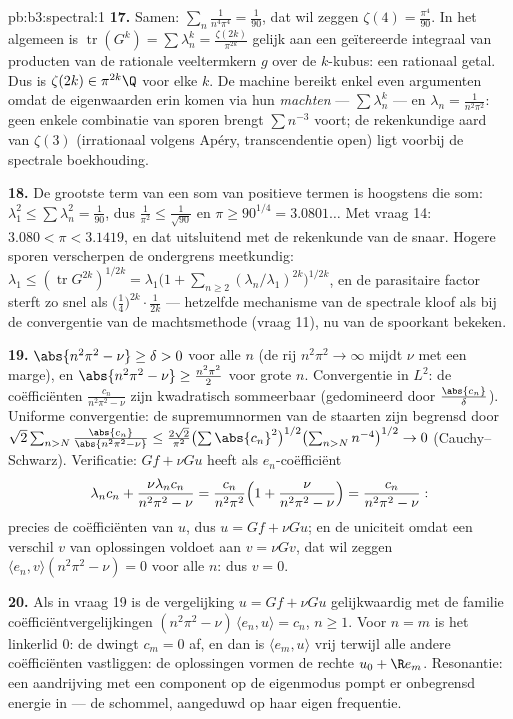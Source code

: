 \begin{solution}{pb:b3:spectral:1}
\textbf{17.} Samen: $\sum_n\frac1{n^4\pi^4} = \frac1{90}$, dat
wil zeggen $\zeta(4) = \frac{\pi^4}{90}$. In het algemeen is
$\operatorname{tr}(G^k) = \sum\lambda_n^k =
\frac{\zeta(2k)}{\pi^{2k}}$ gelijk aan een geïtereerde integraal
van producten van de rationale veeltermkern $g$ over de
$k$-kubus: een rationaal getal. Dus is $\zeta(2k) \in \pi^{2k}\Q$
voor elke $k$. De machine bereikt enkel even argumenten omdat de
eigenwaarden erin komen via hun \emph{machten} ---
$\sum\lambda_n^k$ --- en $\lambda_n = \frac1{n^2\pi^2}$: geen
enkele combinatie van sporen brengt $\sum n^{-3}$ voort; de
rekenkundige aard van $\zeta(3)$ (irrationaal volgens Apéry,
transcendentie open) ligt voorbij de spectrale boekhouding.

\textbf{18.} De grootste term van een som van positieve termen is
hoogstens die som: $\lambda_1^2 \leq \sum\lambda_n^2 =
\frac1{90}$, dus $\frac1{\pi^2} \leq \frac1{\sqrt{90}}$ en $\pi
\geq 90^{1/4} = 3.0801\ldots$ Met vraag 14: $3.080 < \pi <
3.1419$, en dat uitsluitend met de rekenkunde van de snaar.
Hogere sporen verscherpen de ondergrens meetkundig: $\lambda_1
\leq (\operatorname{tr}G^{2k})^{1/2k} =
\lambda_1\bigl(1 + \sum_{n\geq2}(\lambda_n/\lambda_1)^{2k}
\bigr)^{1/2k}$, en de parasitaire factor sterft zo snel als
$\bigl(\tfrac14\bigr)^{2k}\cdot\frac1{2k}$ --- hetzelfde
mechanisme van de spectrale kloof als bij de convergentie van de
machtsmethode (vraag 11), nu van de spoorkant bekeken.

\textbf{19.} $\abs{n^2\pi^2 - \nu} \geq \delta > 0$ voor alle $n$
(de rij $n^2\pi^2 \to \infty$ mijdt $\nu$ met een marge), en
$\abs{n^2\pi^2 - \nu} \geq \frac{n^2\pi^2}2$ voor grote $n$.
Convergentie in $L^2$: de coëfficiënten $\frac{c_n}{n^2\pi^2 -
\nu}$ zijn kwadratisch sommeerbaar (gedomineerd door
$\frac{\abs{c_n}}\delta$). Uniforme convergentie: de
supremumnormen van de staarten zijn begrensd door
$\sqrt2\sum_{n>N} \frac{\abs{c_n}}{\abs{n^2\pi^2 - \nu}} \leq
\frac{2\sqrt2}{\pi^2}\bigl(\sum\abs{c_n}^2\bigr)^{1/2}
\bigl(\sum_{n>N}n^{-4}\bigr)^{1/2} \to 0$ (Cauchy--Schwarz).
Verificatie: $Gf + \nu Gu$ heeft als $e_n$-coëfficiënt
\[
\lambda_nc_n + \frac{\nu\lambda_nc_n}{n^2\pi^2 - \nu}
= \frac{c_n}{n^2\pi^2}\Bigl(1 + \frac{\nu}{n^2\pi^2 -
\nu}\Bigr) = \frac{c_n}{n^2\pi^2 - \nu} :
\]
precies de coëfficiënten van $u$, dus $u = Gf + \nu Gu$; en de
uniciteit omdat een verschil $v$ van oplossingen voldoet aan $v =
\nu Gv$, dat wil zeggen $\langle e_n, v\rangle(n^2\pi^2 - \nu) =
0$ voor alle $n$: dus $v = 0$.

\textbf{20.} Als in vraag 19 is de vergelijking $u = Gf + \nu Gu$
gelijkwaardig met de familie coëfficiëntvergelijkingen
$(n^2\pi^2 - \nu)\,\langle e_n, u\rangle = c_n$, $n \geq 1$. Voor
$n = m$ is het linkerlid $0$: de  dwingt $c_m = 0$
af, en dan is $\langle e_m, u\rangle$ vrij terwijl alle andere
coëfficiënten vastliggen: de oplossingen vormen de rechte $u_0 +
\R e_m$. Resonantie: een aandrijving met een component op de
eigenmodus pompt er onbegrensd energie in --- de schommel,
aangeduwd op haar eigen frequentie.


\end{solution}
